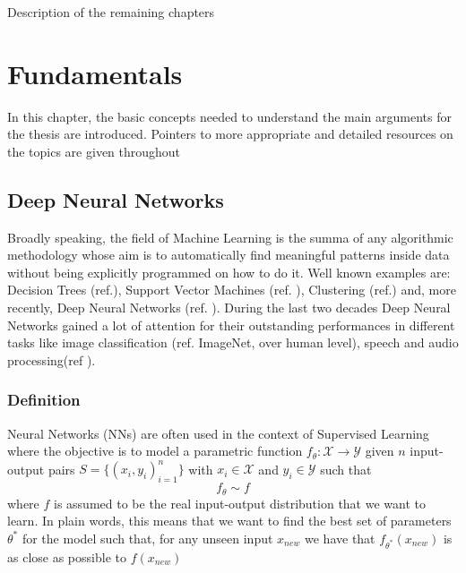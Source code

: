 \documentclass[LaM,binding=0.6cm]{./packages/sapthesis/sapthesis}
\begin{document}
        Description of the remaining chapters 


\chapter{Fundamentals}

    In this chapter, the basic concepts needed to understand the main arguments for the thesis are introduced. Pointers to more appropriate and detailed resources on the topics are given throughout

    \section{Deep Neural Networks}
        
        Broadly speaking, the field of Machine Learning is the summa of any algorithmic methodology whose aim is to automatically find meaningful patterns inside data without
        being explicitly programmed on how to do it. Well known examples are: Decision Trees (ref.), Support Vector Machines (ref. ), Clustering (ref.) and, more recently, 
        Deep Neural Networks (ref. ). During the last two decades Deep Neural Networks gained a lot of attention for their outstanding performances in different tasks like
        image classification (ref. ImageNet, over human level), speech and audio processing(ref ).

        \subsection{Definition}
            
            Neural Networks (NNs) are often used in the context of Supervised Learning where the objective is to model a parametric function 
            $ f_{\theta} \colon \mathcal{X} \to \mathcal{Y}$ given $n$ input-output pairs $S = \{(x_i, y_i)_{i=1}^n\} $ with $x_i \in \mathcal{X}$ and $ y_i \in \mathcal{Y}$
            such that
            \begin{equation}
                f_{\theta} \sim f  
            \end{equation}
            where $f$ is assumed to be the real input-output distribution that we want to learn. In plain words, this means that we want to find the best set of parameters $\theta^{*}$ for the model
            such that, for any unseen input $x_{new}$ we have that $f_{\theta^*}\left(x_{new}\right)$ is as close as possible to $f\left(x_{new}\right)$
\end{document}
